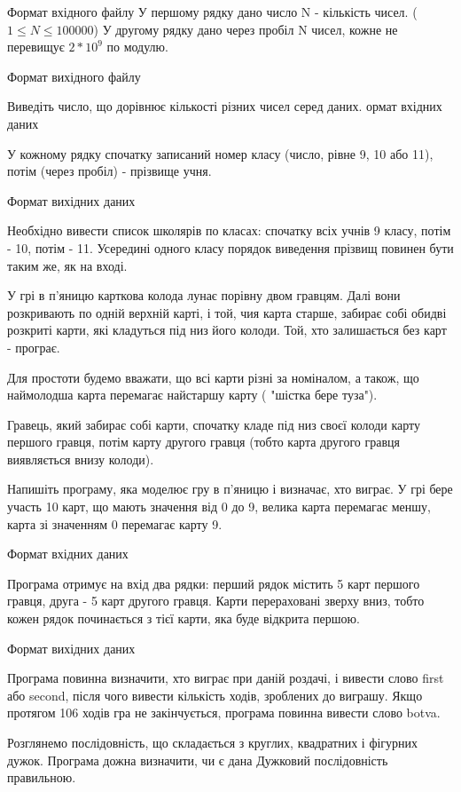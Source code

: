 \documentclass[]{article}
\begin{document}
Формат вхідного файлу
У першому рядку дано число N - кількість чисел. ($1 \le N \le 100000$)
У другому рядку дано через пробіл N чисел, кожне не перевищує $2 * 10^9$ по модулю.


Формат вихідного файлу

Виведіть число, що дорівнює кількості різних чисел серед даних.
ормат вхідних даних

У кожному рядку спочатку записаний номер класу (число, рівне 9, 10 або 11), потім (через пробіл) - прізвище учня.

Формат вихідних даних

Необхідно вивести список школярів по класах: спочатку всіх учнів 9 класу, потім - 10, потім - 11. Усередині одного класу порядок виведення прізвищ повинен бути таким же, як на вході.

У грі в п'яницю карткова колода лунає порівну двом гравцям. Далі вони розкривають по одній верхній карті, і той, чия карта старше, забирає собі обидві розкриті карти, які кладуться під низ його колоди. Той, хто залишається без карт - програє.

Для простоти будемо вважати, що всі карти різні за номіналом, а також, що наймолодша карта перемагає найстаршу карту ( "шістка бере туза").

Гравець, який забирає собі карти, спочатку кладе під низ своєї колоди карту першого гравця, потім карту другого гравця (тобто карта другого гравця виявляється внизу колоди).

Напишіть програму, яка моделює гру в п'яницю і визначає, хто виграє. У грі бере участь 10 карт, що мають значення від 0 до 9, велика карта перемагає меншу, карта зі значенням 0 перемагає карту 9.

Формат вхідних даних

Програма отримує на вхід два рядки: перший рядок містить 5 карт першого гравця, друга - 5 карт другого гравця. Карти перераховані зверху вниз, тобто кожен рядок починається з тієї карти, яка буде відкрита першою.

Формат вихідних даних

Програма повинна визначити, хто виграє при даній роздачі, і вивести слово first або second, після чого вивести кількість ходів, зроблених до виграшу. Якщо протягом 106 ходів гра не закінчується, програма повинна вивести слово botva.

Розглянемо послідовність, що складається з круглих, квадратних і фігурних дужок. Програма дожна визначити, чи є дана Дужковий послідовність правильною.
\end{document}
